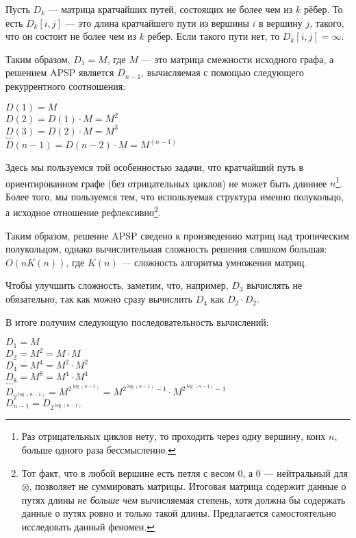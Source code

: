 Пусть $D_k$ --- матрица кратчайших путей, состоящих не более чем из $k$ рёбер. То есть $D_k[i,j]$ --- это длина кратчайшего пути из вершины $i$ в вершину $j$, такого, что он состоит не более чем из $k$ ребер. Если такого пути нет, то $D_k[i,j] = \infty$.

Таким образом, $D_1 = M$, где $M$ --- это матрица смежности исходного графа, а решением APSP является $D_{n-1}$, вычисляемая с помощью следующего рекуррентного соотношения:

\begin{center}
    $D(1) = M$ \\
    $D(2) = D(1) \cdot M = M^2$ \\
    $D(3) = D(2) \cdot M = M^3$ \\
    $\dots$ \\
    $D(n-1) = D(n-2) \cdot M = M^{(n - 1)}$ \\
\end{center}

Здесь мы пользуемся той особенностью задачи, что кратчайший путь в ориентированном графе (без отрицательных циклов) не может быть длиннее $n$\footnote{Раз отрицательных циклов нету, то проходить через одну вершину, коих $n$, больше одного раза бессмысленно.}.
Более того, мы пользуемся тем, что используемая структура именно полукольцо, а исходное отношение рефлексивно\footnote{Тот факт, что в любой вершине есть петля с весом 0, а 0 --- нейтральный для $\otimes$, позволяет не суммировать матрицы. Итоговая матрица содержит данные о путях длины \textit{не больше чем} вычисляемая степень, хотя должна бы содержать данные о путях ровно и только такой длины. Предлагается самостоятельно исследовать данный феномен.}.

Таким образом, решение APSP сведено к произведению матриц над тропическим полукольцом, однако вычислительная сложность решения слишком большая: $O(n K(n))$, где $K(n)$ --- сложность алгоритма умножения матриц.

Чтобы улучшить сложность, заметим, что, например, $D_3$ вычислять не обязательно, так как можно сразу вычислить $D_4$ как $D_2 \cdot D_2$.

В итоге получим следующую последовательность вычислений:

\begin{center}
    $D_1 = M$ \\
    $D_2 = M^2 = M \cdot M$ \\
    $D_4 = M^4 = M^2 \cdot M^2$ \\
    $D_8 = M^8 = M^4 \cdot M^4$ \\
    $\dots$ \\
    $D_{2^{\log(n-1)}} = M^{2^{\log(n-1)}} = M^{2^{\log(n-1)} - 1} \cdot M^{2^{\log(n-1)} - 1}$ \\
    $D_{n-1} = D_{2^{\log(n-1)}}$ \\
\end{center}


